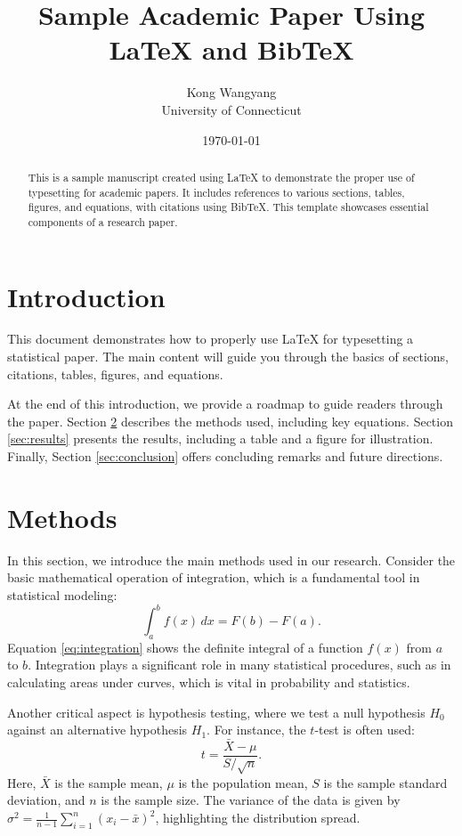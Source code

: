 \documentclass{article}
\title{Sample Academic Paper Using LaTeX and BibTeX}
\author{Kong Wangyang\\
University of Connecticut}
\date{\today}
\begin{document}
\maketitle

\begin{abstract}
This is a sample manuscript created using LaTeX to demonstrate the proper use of typesetting for academic papers. It includes references to various sections, tables, figures, and equations, with citations using BibTeX. This template showcases essential components of a research paper.
\end{abstract}

\section{Introduction}
This document demonstrates how to properly use LaTeX for typesetting a statistical paper. The main content will guide you through the basics of sections, citations, tables, figures, and equations. 

At the end of this introduction, we provide a roadmap to guide readers through the paper. Section \ref{sec:methods} describes the methods used, including key equations. Section \ref{sec:results} presents the results, including a table and a figure for illustration. Finally, Section \ref{sec:conclusion} offers concluding remarks and future directions.

\section{Methods} \label{sec:methods}
In this section, we introduce the main methods used in our research. Consider the basic mathematical operation of integration, which is a fundamental tool in statistical modeling:
\begin{equation}
    \int_a^b f(x) \, dx = F(b) - F(a). \label{eq:integration}
\end{equation}
Equation \eqref{eq:integration} shows the definite integral of a function $f(x)$ from $a$ to $b$. Integration plays a significant role in many statistical procedures, such as in calculating areas under curves, which is vital in probability and statistics.

Another critical aspect is hypothesis testing, where we test a null hypothesis $H_0$ against an alternative hypothesis $H_1$. For instance, the $t$-test is often used:
\[
    t = \frac{\bar{X} - \mu}{S / \sqrt{n}}.
\]
Here, $\bar{X}$ is the sample mean, $\mu$ is the population mean, $S$ is the sample standard deviation, and $n$ is the sample size. The variance of the data is given by $\sigma^2 = \frac{1}{n-1} \sum_{i=1}^{n} (x_i - \bar{x})^2$, highlighting the distribution spread.
\end{document}
